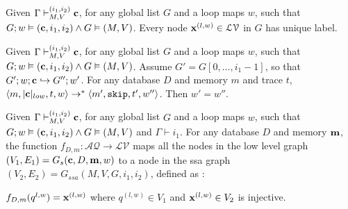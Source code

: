 \documentclass[a4paper,11pt]{article}
\begin{document}
\begin{lem}
Given $ \Gamma \vdash_{M,V}^{(i_1,i_2)} \mathbf{{c}}$, for any global list $G$ and a loop maps $w$, such that $G ;w \vDash (\mathbf{{c}}, i_1, i_2) \land G \vDash (M,V)$. Every node $\mathbf{{x}}^{(l,w)} \in \mathcal{LV}$ in $G$ has unique label.
\end{lem}

\begin{lem}\label{lem:samew}
Given $ \Gamma \vdash_{M,V}^{(i_1,i_2)} \mathbf{{c}}$, for any global list $G$ and a loop maps $w$, such that $G ;w \vDash (\mathbf{{c}}, i_1, i_2) \land G \vDash (M,V)$. 
Assume $G' = G[0, \ldots,i_1-1]$, so that $G';w ;\mathbf{{c}} \hookrightarrow G'' ; w'$. For any database $D$ and memory $m$ and trace $t$,  $\langle m, |\mathbf{{c}}|_{low}, t, w \rangle \to^{*} \langle m', \mathtt{skip}, t', w'' \rangle$. Then $w' = w''$.  
\end{lem}

\begin{lem}\label{lem:vertex}
Given $ \Gamma \vdash_{M,V}^{(i_1,i_2)} \mathbf{{c}}$, for any global list $G$ and a loop maps $w$, such that $G ;w \vDash (\mathbf{{c}}, i_1, i_2) \land G \vDash (M,V)$ and $\Gamma \vdash i_1$. For any database $D$ and memory $\mathbf{{m}}$, the function $f_{D,m}: \mathcal{AQ} \to \mathcal{LV}$ maps all the nodes in the low level graph $(V_1, E_1) = G_{s}(\mathbf{{c}}, D, \mathbf{{m}},w)$ to a node in the ssa graph $(V_2,E_2) = G_{ssa}(M,V,G,i_1,i_2)$, defined as :

$f_{D,m}(q^{l,w}) = \mathbf{{x}}^{(l,w)}$ where $q^{(l,w)} \in V_1 $ and $\mathbf{{x}}^{(l,w)} \in V_2$ is injective.
\end{lem}
\end{document}
